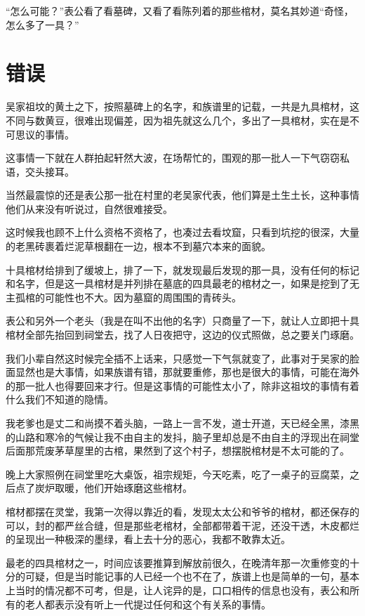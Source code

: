 “怎么可能？”表公看了看墓碑，又看了看陈列着的那些棺材，莫名其妙道“奇怪，怎么多了一具？”

\chapter{错误}

吴家祖坟的黄土之下，按照墓碑上的名字，和族谱里的记载，一共是九具棺材，这不同与数黄豆，很难出现偏差，因为祖先就这么几个，多出了一具棺材，实在是不可思议的事情。

这事情一下就在人群拍起轩然大波，在场帮忙的，围观的那一批人一下气窃窃私语，交头接耳。

当然最震惊的还是表公那一批在村里的老吴家代表，他们算是土生土长，这种事情他们从来没有听说过，自然很难接受。

这时候我也顾不上什么资格不资格了，也凑过去看坟窟，只看到坑挖的很深，大量的老黑砖裹着烂泥草根翻在一边，根本不到墓穴本来的面貌。

十具棺材给排到了缓坡上，排了一下，就发现最后发现的那一具，没有任何的标记和名字，但是这一具棺材是并列排在墓底的四具最老的棺材之一，如果是挖到了无主孤棺的可能性也不大。因为墓窟的周围围的青砖头。

表公和另外一个老头（我是在叫不出他的名字）只商量了一下，就让人立即把十具棺材全部先抬回到祠堂去，找了人日夜把守，这边的仪式照做，总之要关门琢磨。

我们小辈自然这时候完全插不上话来，只感觉一下气氛就变了，此事对于吴家的脸面显然也是大事情，如果族谱有错，那就要重修，那也是很大的事情，可能在海外的那一批人也得要回来才行。但是这事情的可能性太小了，除非这祖坟的事情有着什么我们不知道的隐情。

我老爹也是丈二和尚摸不着头脑，一路上一言不发，道士开道，天已经全黑，漆黑的山路和寒冷的气候让我不由自主的发抖，脑子里却总是不由自主的浮现出在祠堂后面那荒废茅草屋里的古棺，果然到了这个村子，想摆脱棺材是不太可能的了。

晚上大家照例在祠堂里吃大桌饭，祖宗规矩，今天吃素，吃了一桌子的豆腐菜，之后点了炭炉取暖，他们开始琢磨这些棺材。

棺材都摆在灵堂，我第一次得以靠近的看，发现太太公和爷爷的棺材，都还保存的可以，封的都严丝合缝，但是那些老棺材，全部都带着干泥，还没干透，木皮都烂的呈现出一种极深的墨绿，看上去十分的恶心，我都不敢靠太近。

最老的四具棺材之一，时间应该要推算到解放前很久，在晚清年那一次重修变的十分的可疑，但是当时能记事的人已经一个也不在了，族谱上也是简单的一句，基本上当时的情况都不可考，但是，让人诧异的是，口口相传的信息也没有，表公和所有的老人都表示没有听上一代提过任何和这个有关系的事情。

